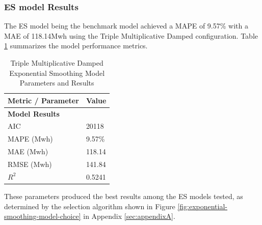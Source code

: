 \subsubsection{ES model Results}
The ES model being the benchmark model achieved a MAPE of 9.57\% with a MAE of 118.14Mwh using the Triple Multiplicative Damped configuration. Table \ref{tab:exp_smoothing_results} summarizes the model performance metrics. 
\begin{table}[h]
	\centering
	\caption{Triple Multiplicative Damped Exponential Smoothing Model Parameters and Results}
	\label{tab:exp_smoothing_results}
	\begin{tabular}{ll}
		\hline
		\textbf{Metric / Parameter} & \textbf{Value} \\
		\hline
		\multicolumn{2}{l}{\textbf{Model Results}} \\
		AIC & 20118 \\
		MAPE (Mwh) &  9.57\% \\
		MAE (Mwh) & 118.14 \\
		RMSE (Mwh) & 141.84 \\
		$R^2$ & 0.5241\\
		\hline
	\end{tabular}
\end{table}
These parameters produced the best results among the ES models tested, as determined by the selection algorithm shown in Figure \ref{fig:exponential-smoothing-model-choice} in Appendix \ref{sec:appendixA}.
